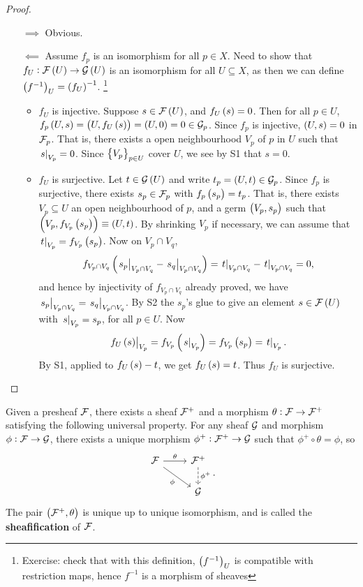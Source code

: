 \begin{proof}
\hfill
\begin{itemize}[leftmargin=0.5in]
\item[$ \implies $] Obvious.
\item[$ \impliedby $] Assume $ f_p $ is an isomorphism for all $ p \in X $. Need to show that $ f_U : \FFF\br{U} \to \GGG\br{U} $ is an isomorphism for all $ U \subseteq X $, as then we can define $ \br{f^{-1}}_U = \br{f_U}^{-1} $. \footnote{Exercise: check that with this definition, $ \br{f^{-1}}_U $ is compatible with restriction maps, hence $ f^{-1} $ is a morphism of sheaves}
\begin{itemize}
\item $ f_U $ is injective. Suppose $ s \in \FFF\br{U} $, and $ f_U\br{s} = 0 $. Then for all $ p \in U $, $ f_p\br{U, s} = \br{U, f_U\br{s}} = \br{U, 0} = 0 \in \GGG_p $. Since $ f_p $ is injective, $ \br{U, s} = 0 $ in $ \mathcal{F}_p $. That is, there exists a open neighbourhood $ V_p $ of $ p $ in $ U $ such that $ \left. s \right|_{V_p} = 0 $. Since $ \cbr{V_p}_{p \in U} $ cover $ U $, we see by S1 that $ s = 0 $.
\item $ f_U $ is surjective. Let $ t \in \GGG\br{U} $ and write $ t_p = \br{U, t} \in \GGG_p $. Since $ f_p $ is surjective, there exists $ s_p \in \mathcal{F}_p $ with $ f_p\br{s_p} = t_p $. That is, there exists $ V_p \subseteq U $ an open neighbourhood of $ p $, and a germ $ \br{V_p, s_p} $ such that $ \br{V_p, f_{V_p}\br{s_p}} \equiv \br{U, t} $. By shrinking $ V_p $ if necessary, we can assume that $ \eval{t}_{V_p} = f_{V_p}\br{s_p} $. Now on $ V_p \cap V_q $,
$$ f_{V_p \cap V_q}\br{\eval{s_p}_{V_p \cap V_q} - \eval{s_q}_{V_p \cap V_q}} = \eval{t}_{V_p \cap V_q} - \eval{t}_{V_p \cap V_q} = 0, $$
and hence by injectivity of $ f_{V_p \cap V_q} $ already proved, we have $ \left. s_p \right|_{V_p \cap V_q} = \left. s_q \right|_{V_p \cap V_q} $. By S2 the $ s_p $'s glue to give an element $ s \in \FFF\br{U} $ with $ \left. s \right|_{V_p} = s_p $, for all $ p \in U $. Now
$$ \eval{f_U\br{s}}_{V_p} = f_{V_p}\br{\eval{s}_{V_p}} = f_{V_p}\br{s_p} = \eval{t}_{V_p}. $$
By S1, applied to $ f_U\br{s} - t $, we get $ f_U\br{s} = t $. Thus $ f_U $ is surjective.
\end{itemize}
\end{itemize}
\end{proof}

\begin{theorem}[Sheafification]
Given a presheaf $ \mathcal{F} $, there exists a sheaf $ \mathcal{F}^+ $ and a morphism $ \theta : \mathcal{F} \to \mathcal{F}^+ $ satisfying the following universal property. For any sheaf $ \mathcal{G} $ and morphism $ \phi : \mathcal{F} \to \mathcal{G} $, there exists a unique morphism $ \phi^+ : \mathcal{F}^+ \to \mathcal{G} $ such that $ \phi^+ \circ \theta = \phi $, so
$$
\begin{tikzcd}
\FFF \arrow{r}{\theta} \arrow{dr}[swap]{\phi} & \FFF^+ \arrow[dashed]{d}{\phi^+} \\
& \GGG
\end{tikzcd}.
$$
The pair $ \br{\FFF^+, \theta} $ is unique up to unique isomorphism, and is called the \textbf{sheafification} of $ \mathcal{F} $.
\end{theorem}

